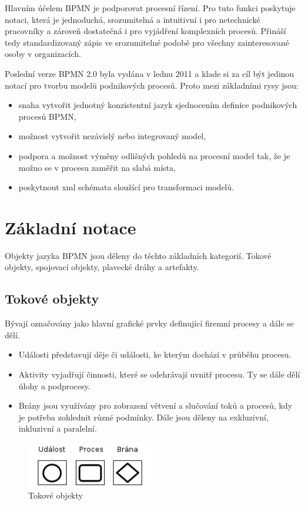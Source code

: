 \documentclass{fithesis}
\begin{document}
Hlavním účelem BPMN je podporovat procesní řízení. Pro tuto funkci poskytuje notaci, která je jednoduchá, srozumitelná a intuitivní i pro netechnické pracovníky a zároveň dostatečná i pro vyjádření komplexních procesů. Přináší tedy standardizovaný zápis ve srozumitelné podobě pro všechny zainteresované osoby v organizacích.

Poslední verze BPMN 2.0 byla vydána v lednu 2011 a klade si za cíl být jedinou notací pro tvorbu modelů podnikových procesů. Proto mezi základními rysy jsou:
\begin{itemize}
\item snaha vytvořit jednotný konzistentní jazyk sjednocením definice podnikových procesů BPMN,
\item možnost vytvořit nezávislý nebo integrovaný model,
\item podpora a možnost výměny odlišných pohledů na procesní model tak, že je možno se v procesu zaměřit na slabá místa,
\item poskytnout xml schémata sloužící pro transformaci modelů.
\end{itemize}

\section{Základní notace}
Objekty jazyka BPMN jsou děleny do těchto základních kategorií. Tokové objekty, spojovací objekty, plavecké dráhy a artefakty. \cite{12}

\subsection{Tokové objekty}
Bývají označovány jako hlavní grafické prvky definující firemní procesy a dále se dělí.

\begin{itemize}
\item Události představují děje či události, ke kterým dochází v průběhu procesu.
\item Aktivity vyjadřují činnosti, které se odehrávají uvnitř procesu. Ty se dále dělí úlohy a podprocesy.
\item Brány jsou využívány pro zobrazení větvení a slučování toků a procesů, kdy je potřeba zohlednit různé podmínky. Dále jsou děleny na exkluzivní, inkluzivní a paralelní.
\end{itemize}

\begin{figure}[htp]
\centering
\includegraphics[width=210px]{images/tokove_objekty.png}
\caption{Tokové objekty}
\end{figure}
\end{document}

